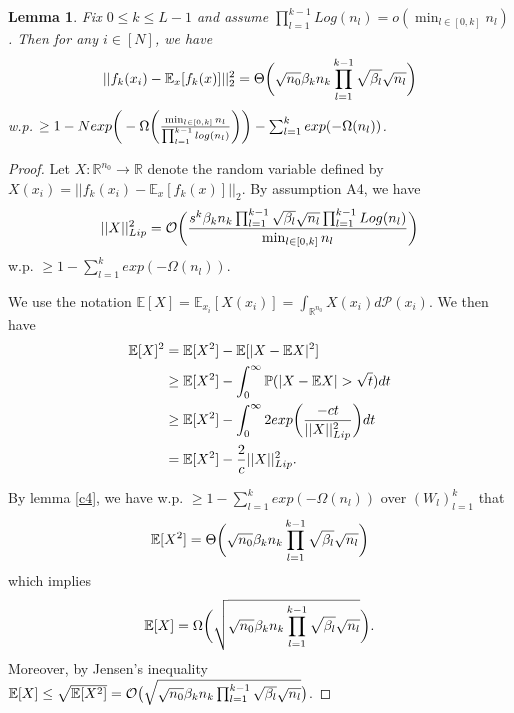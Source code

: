 \documentclass{article}
\theoremstyle{plain}
\newtheorem{lemma}[Theorem]{Lemma}
\theoremstyle{definition}
\theoremstyle{remark}
\newcommand\R{\mathbb{R}}
\begin{document}
\begin{lemma}\label{c3}
Fix $0\leq k \leq L-1$ and assume  $\prod_{l=1}^{k-1}Log(n_l) = o\left(\min_{l \in [0,k]}n_l\right)$.
Then for any $i \in [N]$, we have
\begin{equation*}
\vert\vert f_k(x_i) - \mathbb{E}_x[f_k(x)]\vert\vert_2^2 = 
\Theta\bigg{(} 
\sqrt{n_0}\beta_kn_k\prod_{l=1}^{k-1}\sqrt{\beta_l}\sqrt{n_l}
\bigg{)}
\end{equation*}
w.p. $\geq 
1 - Nexp\bigg{(}-\Omega \bigg{(} 
\frac{\min_{l\in [0,k]}n_l}{\prod_{l=1}^{k-1}log(n_l)}
\bigg{)}
\bigg{)}
- \sum_{l=1}^kexp(-\Omega(n_l))$.
\end{lemma}

\begin{proof}
Let $X : \R^{n_0} \rightarrow \R$ denote the random variable defined 
by $X(x_i) = \vert\vert f_k(x_i) - \mathbb{E}_x[f_k(x)]\vert\vert_2$. 
By assumption A4, we have
\begin{equation*}
	\vert\vert X\vert\vert_{Lip}^2 = \mathcal{O}\bigg{(} 
	\frac{s^k\beta_k n_k\prod_{l=1}^{k-1}\sqrt{\beta_l}
 \sqrt{n_l}\prod_{l=1}^{k-1}Log(n_l)}
	{\min_{l \in [0,k]}n_l}
	\bigg{)}
\end{equation*}
w.p. $\geq 1 - \sum_{l=1}^kexp(-\Omega(n_l))$. 

We use the notation $\mathbb{E}[X] = \mathbb{E}_{x_i}[X(x_i)] = 
\int_{\R^{n_0}}X(x_i)d\mathcal{P}(x_i)$. We then have
\begin{align*}
	\mathbb{E}[X]^2 &= \mathbb{E}[X^2] - 
	\mathbb{E}[\vert X - \mathbb{E}X\vert^2]  \\
	&\geq 
	\mathbb{E}[X^2] - 
	\int_{0}^{\infty}\mathbb{P}(|X - \mathbb{E}X|>\sqrt{t})dt \\
	&\geq 
	\mathbb{E}[X^2] - \int_{0}^{\infty} 
	2exp\bigg{(}\frac{-ct}{\vert\vert X\vert\vert_{Lip}^2} \bigg{)}dt \\
	&=  \mathbb{E}[X^2] - \frac{2}{c}\vert\vert X\vert\vert_{Lip}^2.
\end{align*}

By lemma \ref{c4}, we have w.p. $\geq 1 - \sum_{l=1}^kexp(-\Omega(n_l))$ 
over $(W_l)_{l=1}^k$ that
\begin{equation*}
	\mathbb{E}[X^2] = 
	\Theta\bigg{(}
	\sqrt{n_0}\beta_kn_k\prod_{l=1}^{k-1}\sqrt{\beta_l}\sqrt{n_l}\bigg{)}
\end{equation*}
which implies
\begin{equation*}
\mathbb{E}[X] = 
\Omega\bigg{(}
	\sqrt{\sqrt{n_0}\beta_kn_k\prod_{l=1}^{k-1}\sqrt{\beta_l}\sqrt{n_l}}
	\bigg{)}.
\end{equation*}
Moreover, by Jensen's inequality $\mathbb{E}[X] \leq 
\sqrt{\mathbb{E}[X^2]} = \mathcal{O}\big{(}
\sqrt{\sqrt{n_0}\beta_kn_k\prod_{l=1}^{k-1}\sqrt{\beta_l}\sqrt{n_l}}
\big{)}$. 


\end{proof}
\end{document}
